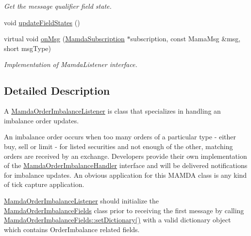 \begin{CompactItemize}
\begin{CompactList}\small\item\em Get the message qualifier field state. \item\end{CompactList}\item 
void \hyperlink{classWombat_1_1MamdaOrderImbalanceListener_4d482115146d7030c0550acf8f63b2b6}{update\-Field\-States} ()
\item 
virtual void \hyperlink{classWombat_1_1MamdaOrderImbalanceListener_b2125b8a0df3f3c01fc9b2f3efa088ce}{on\-Msg} (\hyperlink{classWombat_1_1MamdaSubscription}{Mamda\-Subscription} $\ast$subscription, const Mama\-Msg \&msg, short msg\-Type)
\begin{CompactList}\small\item\em Implementation of Mamda\-Listener interface. \item\end{CompactList}\end{CompactItemize}


\subsection{Detailed Description}
A \hyperlink{classWombat_1_1MamdaOrderImbalanceListener}{Mamda\-Order\-Imbalance\-Listener} is class that specializes in handling an imbalance order updates. 

An imbalance order occurs when too many orders of a particular type - either buy, sell or limit - for listed securities and not enough of the other, matching orders are received by an exchange. Developers provide their own implementation of the \hyperlink{classWombat_1_1MamdaOrderImbalanceHandler}{Mamda\-Order\-Imbalance\-Handler} interface and will be delivered notifications for imbalance updates. An obvious application for this MAMDA class is any kind of tick capture application.

\hyperlink{classWombat_1_1MamdaOrderImbalanceListener}{Mamda\-Order\-Imbalance\-Listener} should initialize the \hyperlink{classWombat_1_1MamdaOrderImbalanceFields}{Mamda\-Order\-Imbalance\-Fields} class prior to receiving the first message by calling \hyperlink{classWombat_1_1MamdaOrderImbalanceFields_e63c54bfcd113c93e66a29bae959770f}{Mamda\-Order\-Imbalance\-Fields::set\-Dictionary()} with a valid dictionary object which contains Order\-Imbalance related fields. 




